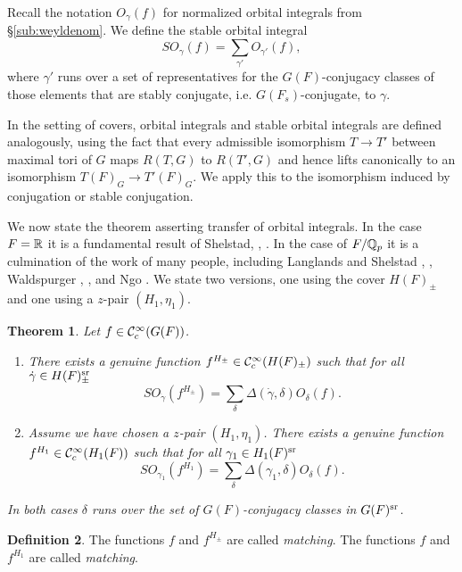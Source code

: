 \documentclass{article}
\newtheorem{thm}{Theorem}[subsection]
\theoremstyle{definition}
\newtheorem{dfn}[thm]{Definition}
\numberwithin{equation}{section}
\renewcommand{\-}{\hyp{}}
\begin{document}
Recall the notation $O_\gamma(f)$ for normalized orbital integrals from \S\ref{sub:weyldenom}. We define the stable orbital integral
\[ SO_\gamma(f) = \sum_{\gamma'} O_{\gamma'}(f), \]
where $\gamma'$ runs over a set of representatives for the $G(F)$-conjugacy classes of those elements that are stably conjugate, i.e. $G(F_s)$-conjugate, to $\gamma$.

In the setting of covers, orbital integrals and stable orbital integrals are defined analogously, using the fact that every admissible isomorphism $T \to T'$ between maximal tori of $G$ maps $R(T,G)$ to $R(T',G)$ and hence lifts canonically to an isomorphism $T(F)_G \to T'(F)_G$. We apply this to the isomorphism induced by conjugation or stable conjugation. 

We now state the theorem asserting transfer of orbital integrals. In the case $F=\mathbb{R}$ it is a fundamental result of Shelstad, \cite{She82}, \cite{SheTE1}. In the case of $F/\mathbb{Q}_p$ it is a culmination of the work of many people, including Langlands and Shelstad \cite{LS87}, \cite{LS90}, Waldspurger \cite{Wal97}, \cite{Wal06ECC}, and Ngo \cite{Ngo10}. We state two versions, one using the cover $H(F)_\pm$ and one using a $z$-pair $(H_1,\eta_1)$. 

\begin{thm} \label{thm:orbtrans}
Let $f \in \mathcal{C}_c^\infty(G(F))$.
\begin{enumerate}
	\item There exists a genuine function $f^{H_\pm} \in \mathcal{C}_c^\infty(H(F)_\pm)$ such that for all $\dot\gamma \in H(F)_\pm^{\textrm{sr}}$
	\[ SO_{\dot\gamma}(f^{H_\pm}) = \sum_\delta \Delta(\dot\gamma,\delta) O_\delta(f). \]
	\item Assume we have chosen a $z$-pair $(H_1,\eta_1)$. There exists a genuine function $f^{H_1} \in \mathcal{C}_c^\infty(H_1(F))$ such that for all $\gamma_1 \in H_1(F)^{\textrm{sr}}$
	\[ SO_{\gamma_1}(f^{H_1}) = \sum_\delta \Delta(\gamma_1,\delta) O_\delta(f). \]
\end{enumerate}


In both cases $\delta$ runs over the set of $G(F)$-conjugacy classes in $G(F)^{\textrm{sr}}$.
\end{thm}

\begin{dfn} \label{dfn:matching}
The functions $f$ and $f^{H_\pm}$ are called \emph{matching}. The functions $f$ and $f^{H_1}$ are called \emph{matching}.
\end{dfn}
\end{document}
